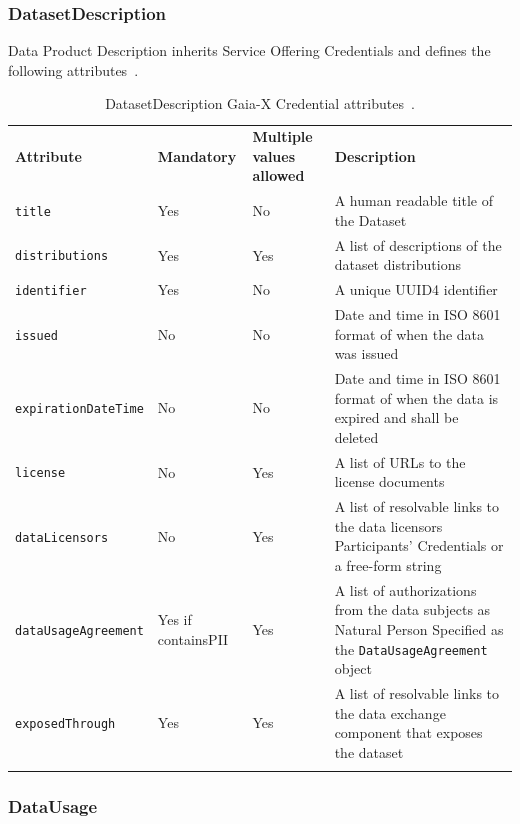 \subsubsection{DatasetDescription}

Data Product Description inherits Service Offering Credentials and defines the following attributes~\cite{gaiax_data_exchange_document}.

\begin{longtable}{ |p{4cm}|p{2cm}|p{2cm}|p{7cm}| }
    \hhline{----}
    \textbf{Attribute} & \textbf{Mandatory} & \textbf{Multiple values allowed} & \textbf{Description}\\
    \hhline{----}
    \texttt{title} & Yes & No & A human readable title of the Dataset\\
    \hhline{----}
    \texttt{distributions} & Yes & Yes & A list of descriptions of the dataset distributions\\
    \hhline{----}
    \texttt{identifier} & Yes & No & A unique UUID4 identifier\\
    \hhline{----}
    \texttt{issued} & No & No & Date and time in ISO 8601 format of when the data was issued\\
    \hhline{----}
    \texttt{expirationDateTime} & No & No & Date and time in ISO 8601 format of when the data is expired and shall be deleted\\
    \hhline{----}
    \texttt{license} & No & Yes & A list of URLs to the license documents\\
    \hhline{----}
    \texttt{dataLicensors} & No & Yes & A list of resolvable links to the data licensors Participants' Credentials or a free-form string\\
    \hhline{----}
    \texttt{dataUsageAgreement} & Yes if containsPII & Yes & A list of authorizations from the data subjects as Natural Person
    Specified as the \texttt{DataUsageAgreement} object\\
    \hhline{----}
    \texttt{exposedThrough} & Yes & Yes & A list of resolvable links to the data exchange component that exposes the dataset\\
    \hhline{----}
    \caption{DatasetDescription Gaia-X Credential attributes~\cite{gaiax_data_exchange_document}.}
    \label{tab:dataset_description}
\end{longtable}

\subsubsection{DataUsage}

